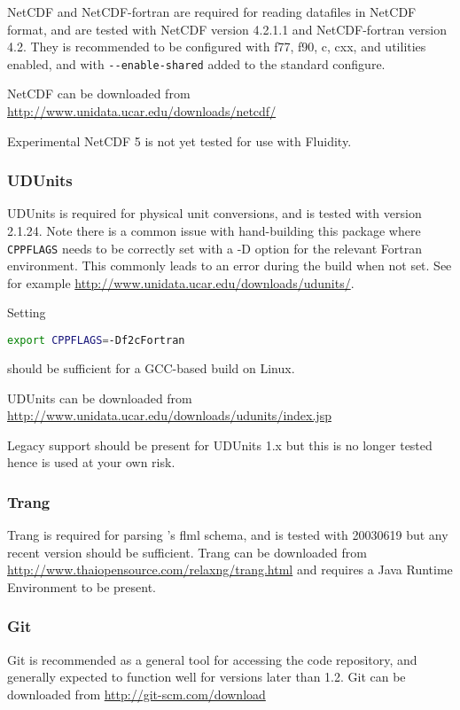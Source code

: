 NetCDF and NetCDF-fortran are required for reading datafiles in NetCDF format,
and are tested with NetCDF version 4.2.1.1 and NetCDF-fortran version 4.2. They
is recommended to be configured with f77, f90, c, cxx, and utilities enabled,
and with \lstinline[language=bash]+--enable-shared+ added to the standard
configure.

NetCDF can be downloaded from \url{http://www.unidata.ucar.edu/downloads/netcdf/}

Experimental NetCDF 5 is not yet tested for use with Fluidity.

\subsubsection{UDUnits}
\label{sec:required_libraries_supporting_udunits}

UDUnits is required for physical unit conversions, and is tested with version
2.1.24. Note there is a common issue with hand-building this package where
\lstinline[language=bash]+CPPFLAGS+ needs to be correctly set with a -D
option for the relevant Fortran environment. This commonly leads to an error
during the build when not set. See for example
\url{http://www.unidata.ucar.edu/downloads/udunits/}.

Setting

\begin{lstlisting}[language=bash]
export CPPFLAGS=-Df2cFortran
\end{lstlisting}

should be sufficient for a GCC-based build on Linux.

UDUnits can be downloaded from \url{http://www.unidata.ucar.edu/downloads/udunits/index.jsp}

Legacy support should be present for UDUnits 1.x but this is no longer tested
hence is used at your own risk.

\subsubsection{Trang}
\label{sec:required_libraries_supporting_trang}

Trang is required for parsing \fluidity's flml schema, and is tested with
20030619 but any recent version should be sufficient. Trang can be downloaded
from \url{http://www.thaiopensource.com/relaxng/trang.html} and requires a
Java Runtime Environment to be present.

\subsubsection{Git}
\label{sec:required_libraries_supporting_git}

Git is recommended as a general tool for accessing the \fluidity code
repository, and generally expected to function well for versions later than
1.2. Git can be downloaded from \url{http://git-scm.com/download}
